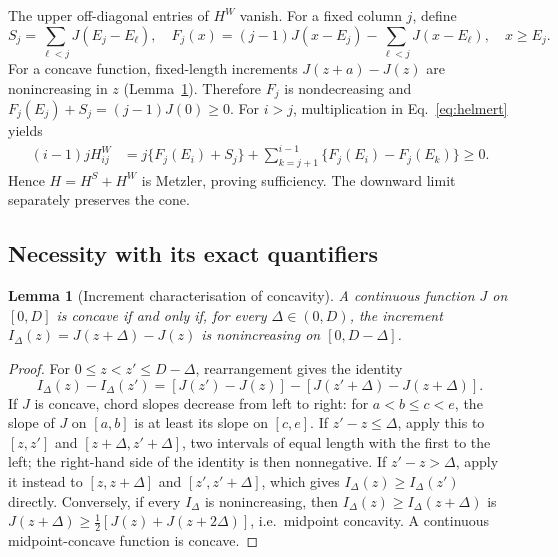 \documentclass[11pt,a4paper]{article}
\newtheorem{lemma}[theorem]{Lemma}
\theoremstyle{remark}\newtheorem{remark}[theorem]{Remark}
\begin{document}
The upper off-diagonal entries of $H^W$ vanish. For a fixed column $j$, define
\begin{equation}
 S_j=\sum_{\ell<j}J(E_j-E_\ell),\quad
 F_j(x)=(j-1)J(x-E_j)-\sum_{\ell<j}J(x-E_\ell),\quad x\ge E_j.
\end{equation}
For a concave function, fixed-length increments $J(z+a)-J(z)$ are nonincreasing in $z$ (Lemma~\ref{lem:increments}). Therefore $F_j$ is nondecreasing and $F_j(E_j)+S_j=(j-1)J(0)\ge0$. For $i>j$, multiplication in Eq.~\eqref{eq:helmert} yields
\begin{align}
 (i-1)jH^W_{ij}
 &=j\{F_j(E_i)+S_j\}
   +\sum_{k=j+1}^{i-1}\{F_j(E_i)-F_j(E_k)\}\ge0.
 \label{eq:downH}
\end{align}
Hence $H=H^S+H^W$ is Metzler, proving sufficiency. The downward limit separately preserves the cone.

\subsection{Necessity with its exact quantifiers}
\begin{lemma}[Increment characterisation of concavity]\label{lem:increments}
A continuous function $J$ on $[0,D]$ is concave if and only if, for every $\Delta\in(0,D)$, the increment $I_\Delta(z)=J(z+\Delta)-J(z)$ is nonincreasing on $[0,D-\Delta]$.
\end{lemma}
\begin{proof}
For $0\le z<z'\le D-\Delta$, rearrangement gives the identity
\begin{equation}
 I_\Delta(z)-I_\Delta(z')=[J(z')-J(z)]-[J(z'+\Delta)-J(z+\Delta)].
\end{equation}
If $J$ is concave, chord slopes decrease from left to right: for $a<b\le c<e$, the slope of $J$ on $[a,b]$ is at least its slope on $[c,e]$. If $z'-z\le\Delta$, apply this to $[z,z']$ and $[z+\Delta,z'+\Delta]$, two intervals of equal length with the first to the left; the right-hand side of the identity is then nonnegative. If $z'-z>\Delta$, apply it instead to $[z,z+\Delta]$ and $[z',z'+\Delta]$, which gives $I_\Delta(z)\ge I_\Delta(z')$ directly. Conversely, if every $I_\Delta$ is nonincreasing, then $I_\Delta(z)\ge I_\Delta(z+\Delta)$ is $J(z+\Delta)\ge\frac12[J(z)+J(z+2\Delta)]$, i.e.\ midpoint concavity. A continuous midpoint-concave function is concave.
\end{proof}
\end{document}
